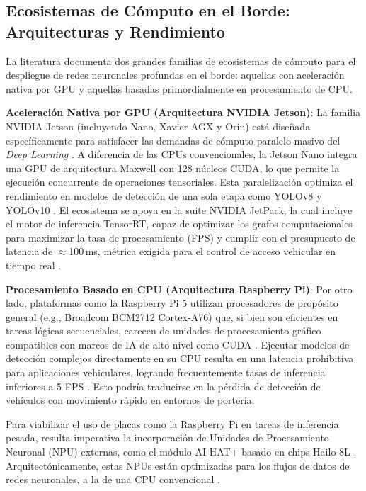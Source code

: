 \subsection{Ecosistemas de Cómputo en el Borde: Arquitecturas y Rendimiento}

La literatura documenta dos grandes familias de ecosistemas de cómputo para el despliegue 
de redes neuronales profundas en el borde: aquellas con aceleración nativa por GPU y 
aquellas basadas primordialmente en procesamiento de CPU.

\textbf{Aceleración Nativa por GPU (Arquitectura NVIDIA Jetson)}: 
La familia NVIDIA Jetson (incluyendo Nano, Xavier AGX y Orin) está diseñada específicamente 
para satisfacer las demandas de cómputo paralelo masivo del \textit{Deep Learning} 
\parencite{ammarMultiStageDeepLearningBasedVehicle2023, sonnaraEfficientRealtimeLicense2025}. 
A diferencia de las CPUs convencionales, la Jetson Nano integra una GPU de arquitectura Maxwell 
con 128 núcleos CUDA, lo que permite la ejecución concurrente de operaciones tensoriales. 
Esta paralelización optimiza el rendimiento en modelos de detección de una sola etapa como 
YOLOv8 y YOLOv10 \parencite{meesadAdvancedDeepLearning2025a, sonnaraEfficientRealtimeLicense2025}. 
El ecosistema se apoya en la suite NVIDIA JetPack, la cual incluye el motor de inferencia 
TensorRT, capaz de optimizar los grafos computacionales para maximizar la tasa de procesamiento 
(FPS) y cumplir con el presupuesto de latencia de $\approx$100\,ms, métrica exigida para 
el control de acceso vehicular en tiempo real \parencite{ammarMultiStageDeepLearningBasedVehicle2023, sonnaraEfficientRealtimeLicense2025}.

\textbf{Procesamiento Basado en CPU (Arquitectura Raspberry Pi)}: 
Por otro lado, plataformas como la Raspberry Pi 5 utilizan procesadores de propósito 
general (e.g., Broadcom BCM2712 Cortex-A76) que, si bien son eficientes en tareas 
lógicas secuenciales, carecen de unidades de procesamiento gráfico compatibles con 
marcos de IA de alto nivel como CUDA \parencite{oluwaseyiComparativeAnalysisYOLOv52025}. 
Ejecutar modelos de detección complejos directamente en su CPU resulta en una latencia 
prohibitiva para aplicaciones vehiculares, logrando frecuentemente tasas de inferencia 
inferiores a 5 FPS \parencite{oluwaseyiComparativeAnalysisYOLOv52025, xuDeepLearningAlgorithms2026c}. 
Esto podría traducirse en la pérdida de detección de vehículos con movimiento rápido en 
entornos de portería.

Para viabilizar el uso de placas como la Raspberry Pi en tareas de inferencia pesada, 
resulta imperativa la incorporación de Unidades de Procesamiento Neuronal (NPU) externas, 
como el módulo AI HAT+ basado en chips Hailo-8L \parencite{oluwaseyiComparativeAnalysisYOLOv52025}. 
Arquitectónicamente, estas NPUs están optimizadas para los flujos de datos de redes neuronales, 
a la de una CPU convencional \parencite{oluwaseyiComparativeAnalysisYOLOv52025, xuDeepLearningAlgorithms2026c}.

